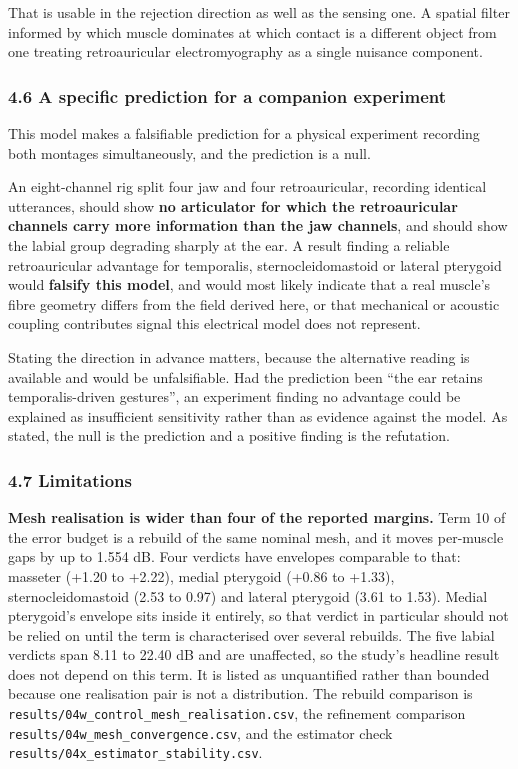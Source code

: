 \documentclass[manuscript,review,anonymous]{acmart}
\begin{document}
That is usable in the rejection direction as well as the sensing one. A spatial
filter informed by which muscle dominates at which contact is a different object
from one treating retroauricular electromyography as a single nuisance
component.

\subsubsection{4.6 A specific prediction for a companion experiment}\label{a-specific-prediction-for-a-companion-experiment}

This model makes a falsifiable prediction for a physical experiment recording
both montages simultaneously, and the prediction is a null.

An eight-channel rig split four jaw and four retroauricular, recording identical
utterances, should show \textbf{no articulator for which the retroauricular channels
carry more information than the jaw channels}, and should show the labial group
degrading sharply at the ear. A result finding a reliable retroauricular
advantage for temporalis, sternocleidomastoid or lateral pterygoid would
\textbf{falsify this model}, and would most likely indicate that a real muscle's fibre
geometry differs from the field derived here, or that mechanical or acoustic
coupling contributes signal this electrical model does not represent.

Stating the direction in advance matters, because the alternative reading is
available and would be unfalsifiable. Had the prediction been ``the ear retains
temporalis-driven gestures'', an experiment finding no advantage could be
explained as insufficient sensitivity rather than as evidence against the model.
As stated, the null is the prediction and a positive finding is the refutation.

\subsubsection{4.7 Limitations}\label{limitations}

\textbf{Mesh realisation is wider than four of the reported margins.} Term 10 of the
error budget is a rebuild of the same nominal mesh, and it moves per-muscle gaps
by up to 1.554 dB. Four verdicts have envelopes comparable to that: masseter
(+1.20 to +2.22), medial pterygoid (+0.86 to +1.33), sternocleidomastoid (\textminus{}2.53
to \textminus{}0.97) and lateral pterygoid (\textminus{}3.61 to \textminus{}1.53). Medial pterygoid's envelope
sits inside it entirely, so that verdict in particular should not be relied on
until the term is characterised over several rebuilds. The five labial verdicts
span 8.11 to 22.40 dB and are unaffected, so the study's headline result does
not depend on this term. It is listed as unquantified rather than bounded
because one realisation pair is not a distribution. The rebuild comparison is
\texttt{results/04w\_control\_mesh\_realisation.csv}, the refinement comparison
\texttt{results/04w\_mesh\_convergence.csv}, and the estimator check
\texttt{results/04x\_estimator\_stability.csv}.
\end{document}
